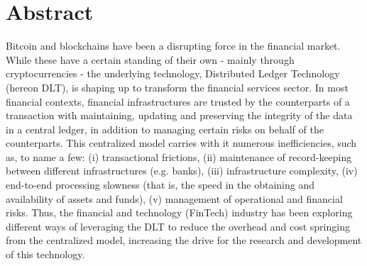 
\newpage

\mbox{}\vfill
\chapter*{\centering Abstract}

Bitcoin and blockchains have been a disrupting force in the financial market. While these have a certain standing of their own - mainly through cryptocurrencies - the underlying technology, Distributed Ledger Technology (hereon DLT), is shaping up to transform the financial services sector. 
In most financial contexts, financial infrastructures are trusted by the counterparts of a transaction with maintaining, updating and preserving the integrity of the data in a central ledger, in addition to managing certain risks on behalf of the counterparts.
This centralized model carries with it numerous inefficiencies, such as, to name a few: (i) transactional frictions, (ii) maintenance of record-keeping between different infrastructures (e.g. banks),  (iii) infrastructure complexity, (iv) end-to-end processing slowness (that is, the speed in the obtaining and availability of assets and funds), (v) management of operational and financial risks. 
Thus, the financial and technology (FinTech) industry has been exploring different ways of leveraging the DLT to reduce the overhead and cost springing from the centralized model, increasing the drive for the research and development of this technology.



\iffalse 
// appunti
DLT could reduce the traditional reliance on a central ledger managed by a trusted
entity for holding and transferring funds and other financial assets.
transparency and immutability in transaction record-keeping?
improving resilience through distributed data management?
\fi
\mbox{}\vfill
